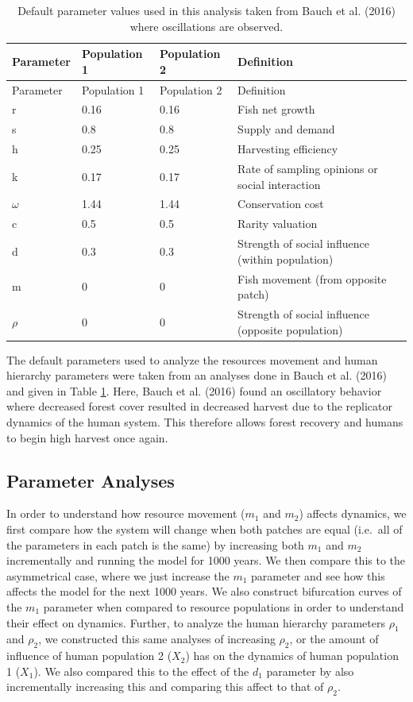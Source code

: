 \documentclass[
  12pt,
]{article}
\begin{document}
\begin{longtable}[]{@{}llll@{}}
\caption{\label{tab:DefaultParamTable}Default parameter values used in this analysis taken from Bauch et al. (2016) where oscillations are observed. \label{DefaultParamTable}}\tabularnewline
\toprule\noalign{}
Parameter & Population 1 & Population 2 & Definition \\
\midrule\noalign{}
\endfirsthead
\toprule\noalign{}
Parameter & Population 1 & Population 2 & Definition \\
\midrule\noalign{}
\endhead
\bottomrule\noalign{}
\endlastfoot
r & 0.16 & 0.16 & Fish net growth \\
s & 0.8 & 0.8 & Supply and demand \\
h & 0.25 & 0.25 & Harvesting efficiency \\
k & 0.17 & 0.17 & Rate of sampling opinions or social interaction \\
\(\omega\) & 1.44 & 1.44 & Conservation cost \\
c & 0.5 & 0.5 & Rarity valuation \\
d & 0.3 & 0.3 & Strength of social influence (within population) \\
m & 0 & 0 & Fish movement (from opposite patch) \\
\(\rho\) & 0 & 0 & Strength of social influence (opposite population) \\
\end{longtable}

The default parameters used to analyze the resources movement and human hierarchy parameters were taken from an analyses done in Bauch et al. (2016) and given in Table \ref{DefaultParamTable}. Here, Bauch et al. (2016) found an oscillatory behavior where decreased forest cover resulted in decreased harvest due to the replicator dynamics of the human system. This therefore allows forest recovery and humans to begin high harvest once again.

\hypertarget{parameter-analyses}{%
\subsection{Parameter Analyses}\label{parameter-analyses}}

In order to understand how resource movement (\(m_1\) and \(m_2\)) affects dynamics, we first compare how the system will change when both patches are equal (i.e.~all of the parameters in each patch is the same) by increasing both \(m_1\) and \(m_2\) incrementally and running the model for 1000 years. We then compare this to the asymmetrical case, where we just increase the \(m_1\) parameter and see how this affects the model for the next 1000 years. We also construct bifurcation curves of the \(m_1\) parameter when compared to resource populations in order to understand their effect on dynamics. Further, to analyze the human hierarchy parameters \(\rho_1\) and \(\rho_2\), we constructed this same analyses of increasing \(\rho_2\), or the amount of influence of human population 2 (\(X_2\)) has on the dynamics of human population 1 (\(X_1\)). We also compared this to the effect of the \(d_1\) parameter by also incrementally increasing this and comparing this affect to that of \(\rho_2\).
\end{document}
